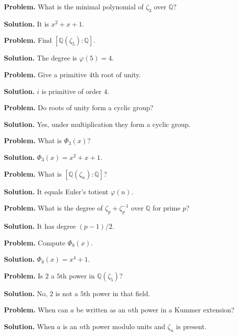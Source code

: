 \begin{example}\label{ex:sec8-1}
\textbf{Problem.} What is the minimal polynomial of $\zeta_3$ over $\mathbb{Q}$?

\textbf{Solution.} It is $x^2+x+1$.
\end{example}

\begin{example}\label{ex:sec8-2}
\textbf{Problem.} Find $[\mathbb{Q}(\zeta_5):\mathbb{Q}]$.

\textbf{Solution.} The degree is $\varphi(5)=4$.
\end{example}

\begin{example}\label{ex:sec8-3}
\textbf{Problem.} Give a primitive $4$th root of unity.

\textbf{Solution.} $i$ is primitive of order $4$.
\end{example}

\begin{example}\label{ex:sec8-4}
\textbf{Problem.} Do roots of unity form a cyclic group?

\textbf{Solution.} Yes, under multiplication they form a cyclic group.
\end{example}

\begin{example}\label{ex:sec8-5}
\textbf{Problem.} What is $\Phi_3(x)$?

\textbf{Solution.} $\Phi_3(x)=x^2+x+1$.
\end{example}

\begin{example}\label{ex:sec8-6}
\textbf{Problem.} What is $[\mathbb{Q}(\zeta_n):\mathbb{Q}]$?

\textbf{Solution.} It equals Euler's totient $\varphi(n)$.
\end{example}

\begin{example}\label{ex:sec8-7}
\textbf{Problem.} What is the degree of $\zeta_p+\zeta_p^{-1}$ over $\mathbb{Q}$ for prime $p$?

\textbf{Solution.} It has degree $(p-1)/2$.
\end{example}

\begin{example}\label{ex:sec8-8}
\textbf{Problem.} Compute $\Phi_8(x)$.

\textbf{Solution.} $\Phi_8(x)=x^4+1$.
\end{example}

\begin{example}\label{ex:sec8-9}
\textbf{Problem.} Is $2$ a $5$th power in $\mathbb{Q}(\zeta_5)$?

\textbf{Solution.} No, $2$ is not a $5$th power in that field.
\end{example}

\begin{example}\label{ex:sec8-10}
\textbf{Problem.} When can $a$ be written as an $n$th power in a Kummer extension?

\textbf{Solution.} When $a$ is an $n$th power modulo units and $\zeta_n$ is present.
\end{example}
